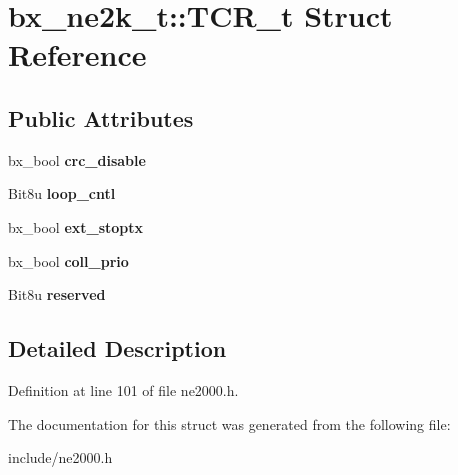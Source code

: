 \hypertarget{structbx__ne2k__t_1_1TCR__t}{\section{bx\-\_\-ne2k\-\_\-t\-:\-:T\-C\-R\-\_\-t Struct Reference}
\label{structbx__ne2k__t_1_1TCR__t}
}
\subsection*{Public Attributes}
\begin{DoxyCompactItemize}
\item 
\hypertarget{structbx__ne2k__t_1_1TCR__t_aaf2fa82df9bdbef37c5b71f5f3c50393}{bx\-\_\-bool {\bfseries crc\-\_\-disable}}\label{structbx__ne2k__t_1_1TCR__t_aaf2fa82df9bdbef37c5b71f5f3c50393}

\item 
\hypertarget{structbx__ne2k__t_1_1TCR__t_acb6a70ae259fb54724467e0beff02c65}{Bit8u {\bfseries loop\-\_\-cntl}}\label{structbx__ne2k__t_1_1TCR__t_acb6a70ae259fb54724467e0beff02c65}

\item 
\hypertarget{structbx__ne2k__t_1_1TCR__t_a97248142eac1ef02c30902d382ab378d}{bx\-\_\-bool {\bfseries ext\-\_\-stoptx}}\label{structbx__ne2k__t_1_1TCR__t_a97248142eac1ef02c30902d382ab378d}

\item 
\hypertarget{structbx__ne2k__t_1_1TCR__t_abe5f1b030777bbd025dfbda7da590c6e}{bx\-\_\-bool {\bfseries coll\-\_\-prio}}\label{structbx__ne2k__t_1_1TCR__t_abe5f1b030777bbd025dfbda7da590c6e}

\item 
\hypertarget{structbx__ne2k__t_1_1TCR__t_abb8459cc10ae6e29259ca08712bc4075}{Bit8u {\bfseries reserved}}\label{structbx__ne2k__t_1_1TCR__t_abb8459cc10ae6e29259ca08712bc4075}

\end{DoxyCompactItemize}


\subsection{Detailed Description}


Definition at line 101 of file ne2000.\-h.



The documentation for this struct was generated from the following file\-:\begin{DoxyCompactItemize}
\item 
include/ne2000.\-h\end{DoxyCompactItemize}
